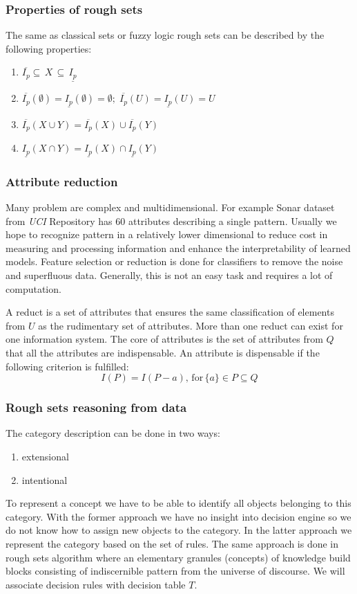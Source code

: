 \subsubsection{Properties of rough sets}
The same as classical sets or fuzzy logic rough sets can be described by the
following properties:
\begin{enumerate}
    \item $\overline{I_p} \subseteq \, X \, \subseteq \, \underline{I_p}$
    \item $\overline{I_p}(\emptyset) = \underline{I_p}(\emptyset) = \emptyset;
        \;
        \overline{I_p}(U) = \underline{I_p}(U) = U $
    \item $\overline{I_p}(X \cup Y) = \overline{I_p}(X) \cup \overline{I_p}(Y)$
    \item $\underline{I_p}(X \cap Y) = \underline{I_p}(X) \cap \underline{I_p}(Y)$
\end{enumerate}

\subsubsection{Attribute reduction}
\label{cha:Rough_set_attribute_reduction}
Many problem are complex and multidimensional. For example Sonar dataset from
\textit{UCI} Repository has 60 attributes describing a single pattern. 
Usually we hope to recognize pattern in a relatively
lower dimensional to reduce cost in measuring and processing information and
enhance the interpretability of learned models. Feature selection or reduction 
is done for classifiers to remove the noise and superfluous data. Generally,
this is not an easy task and requires a lot of computation. 


A reduct is a set of attributes that ensures the same classification of
elements from $U$ as the rudimentary set of attributes. More than one reduct
can exist for one information system. The core of attributes is the set of
attributes from $Q$ that all the attributes are indispensable. An attribute is
dispensable if the following criterion is fulfilled:
$$I(P) = I(P-{a}), \, \textrm{for} \, \{a\} \in P \subseteq  Q $$

\subsubsection{Rough sets reasoning from data}
The category description can be done in two ways:
\begin{enumerate}
    \item extensional
    \item intentional
\end{enumerate}
To represent a concept we have to be able to identify all objects belonging 
to this category. With the former approach we have no insight 
into decision engine so we do not know how to assign new objects to the category.
In the latter approach we represent the category based on the set of rules. The same 
approach is done in rough sets algorithm where an elementary 
granules (concepts) of knowledge build blocks consisting 
of indiscernible pattern from the universe of discourse. 
We will associate decision rules with decision table $T$.

